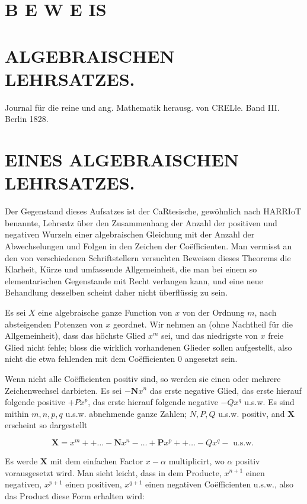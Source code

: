 \documentclass[10pt]{article}
\begin{document}
\section*{B E W E IS }


\section*{ALGEBRAISCHEN LEHRSATZES.}
Journal für die reine und ang. Mathematik herausg. von CRELle. Band III. Berlin 1828.

\section*{EINES ALGEBRAISCHEN LEHRSATZES.}
Der Gegenstand dieses Aufsatzes ist der CaRtesische, gewöhnlich nach HARRIoT benannte, Lehrsatz über den Zusammenhang der Anzahl der positiven und negativen Wurzeln einer algebraischen Gleichung mit der Anzahl der Abwechselungen und Folgen in den Zeichen der Coëfficienten. Man vermisst an den von verschiedenen Schriftstellern versuchten Beweisen dieses Theorems die Klarheit, Kürze und umfassende Allgemeinheit, die man bei einem so elementarischen Gegenstande mit Recht verlangen kann, und eine neue Behandlung desselben scheint daher nicht überflüssig zu sein.

Es sei \(X\) eine algebraische ganze Function von \(x\) von der Ordnung \(m\), nach absteigenden Potenzen von \(x\) geordnet. Wir nehmen an (ohne Nachtheil für die Allgemeinheit), dass das höchste Glied \(x^{m}\) sei, und das niedrigste von \(x\) freie Glied nicht fehle; bloss die wirklich vorhandenen Glieder sollen aufgestellt, also nicht die etwa fehlenden mit dem Coëfficienten 0 angesetzt sein.

Wenn nicht alle Coëfficienten positiv sind, so werden sie einen oder mehrere Zeichenwechsel darbieten. Es sei \(-\boldsymbol{N} x^{n}\) das erste negative Glied, das erste hierauf folgende positive \(+P x^{p}\), das erste hierauf folgende negative \(-Q x^{q}\) u.s.w. Es sind mithin \(m, n, p, q\) u.s.w. abnehmende ganze Zahlen; \(N, P, Q\) u.s.w. positiv, and \(\mathbf{X}\) erscheint so dargestellt

\[
\mathbf{X}=x^{m}++\ldots-\boldsymbol{N} x^{n}-\ldots+\boldsymbol{P} x^{p}++\ldots-Q x^{q}-\text { u.s.w. }
\]

Es werde \(\boldsymbol{X}\) mit dem einfachen Factor \(x-\alpha\) multiplicirt, wo \(\alpha\) positiv vorausgesetzt wird. Man sieht leicht, dass in dem Producte, \(x^{n+1}\) einen negativen, \(x^{p+1}\) einen positiven, \(x^{q+1}\) einen negativen Coëfficienten u.s.w., also das Product diese Form erhalten wird:
\end{document}
